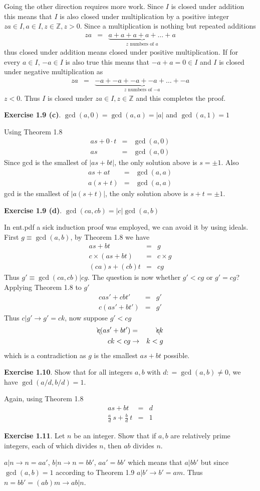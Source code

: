 \documentclass[aps,preprint,preprintnumbers,nofootinbib,showpacs,prd]{revtex4-1}
\newcommand{\nbea}{\begin{eqnarray*}}
\newcommand{\neea}{\end{eqnarray*}}
\begin{document}
Going the other direction requires more work. Since $I$ is closed under addition this means that $I$ is also closed under multiplication by a positive integer $za \in I, a\in I, z \in \mathbb{Z}, z > 0$. Since a multiplication is nothing but repeated additions
%
\nbea
za & = & \underbrace{a + a + a + a + \dots + a}_\text{$z$ numbers of $a$}
\neea
%
thus closed under addition means closed under positive multiplication. If for every $a \in I$, $-a \in I$ is also true this means that $-a + a = 0 \in I$ and $I$ is closed under negative multiplication as
%
\nbea
za & = & \underbrace{-a + -a + -a + -a + \dots + -a}_\text{$z$ numbers of $-a$}
\neea
%
$z < 0$. Thus $I$ is closed under $za \in I, z \in \mathbb{Z}$ and this completes the proof.

{\bf Exercise 1.9 (c)}. $\gcd(a,0) = \gcd(a,a) = |a|$ and $\gcd(a,1) = 1$

Using Theorem 1.8
%
\nbea
as + 0\cdot t & = & \gcd(a,0) \\
as & = & \gcd(a,0)
\neea
%
Since gcd is the smallest of $|as + bt|$, the only solution above is $s=\pm 1$. Also
%
\nbea
as + at & = & \gcd(a,a) \\
a(s + t) & = & \gcd(a,a)
\neea
%
gcd is the smallest of $|a(s + t)|$, the only solution above is $s+t=\pm 1$.

{\bf Exercise 1.9 (d)}. $\gcd(ca,cb) = |c| \gcd(a,b)$

In ent.pdf a sick induction proof was employed, we can avoid it by using ideals. First $g \equiv \gcd(a,b)$, by Theorem 1.8 we have
%
\nbea
as + bt & = & g \\
c \times (as + bt) & = & c \times g \\
(ca)s + (cb)t & = & cg
\neea
%
Thus $ g' \equiv \gcd(ca,cb) | cg$. The question is now whether $g' < cg$ or $g' = cg$? Applying Theorem 1.8 to $g'$
%
\nbea
cas' + cbt' & = & g' \\
c(as' + bt') & = & g'
\neea
%
Thus $c|g' \to g' = ck$, now suppose $g' < cg$
%
\nbea
\bcancel{c}(as' + bt') & = & \bcancel{c}k \\
ck < cg & \to & k < g
\neea
%
which is a contradiction as $g$ is the smallest $as + bt$ possible.

{\bf Exercise 1.10}. Show that for all integers $a, b$ with $d : = \gcd(a, b) \neq 0$, we have
$\gcd(a/d, b/d) = 1$.

Again, using Theorem 1.8
%
\nbea
as + bt & = & d \\
\frac{a}{d} ~s + \frac{b}{d} ~t & = & 1
\neea
%

{\bf Exercise 1.11}. Let $n$ be an integer. Show that if $a, b$ are relatively prime integers,
each of which divides $n$, then $ab$ divides $n$.

$a|n \to n = aa'$, $b|n \to n = bb'$, $aa'=bb'$ which means that $a|bb'$ but since $\gcd(a,b)=1$ according to Theorem 1.9 $a|b' \to b' = am$. Thus $n = bb' = (ab)m \to ab|n$.
\end{document}
